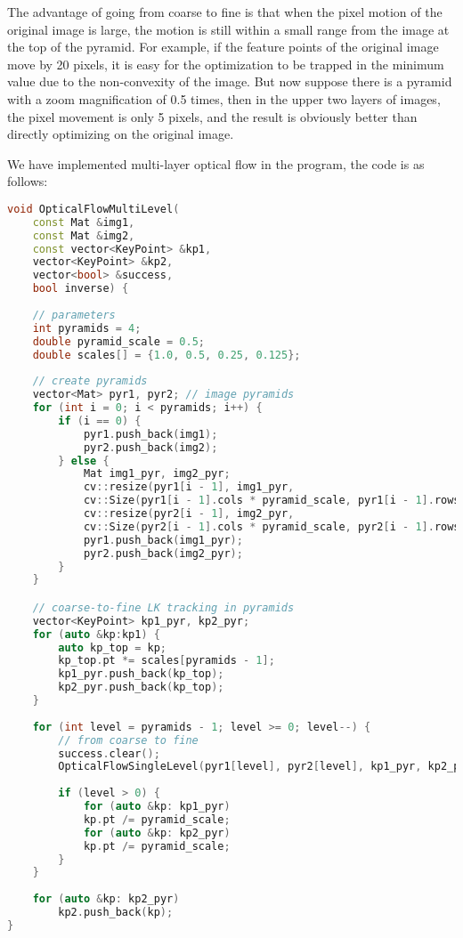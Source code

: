 {The advantage of going from coarse to fine is that when the pixel motion of the original image is large, the motion is still within a small range from the image at the top of the pyramid. For example, if the feature points of the original image move by 20 pixels, it is easy for the optimization to be trapped in the minimum value due to the non-convexity of the image. But now suppose there is a pyramid with a zoom magnification of 0.5 times, then in the upper two layers of images, the pixel movement is only 5 pixels, and the result is obviously better than directly optimizing on the original image.

We have implemented multi-layer optical flow in the program, the code is as follows:
\begin{lstlisting}[language=c++,caption=slambook2/ch8/optical_flow.cpp (snippet)]
void OpticalFlowMultiLevel(
	const Mat &img1,
	const Mat &img2,
	const vector<KeyPoint> &kp1,
	vector<KeyPoint> &kp2,
	vector<bool> &success,
	bool inverse) {
	
	// parameters
	int pyramids = 4;
	double pyramid_scale = 0.5;
	double scales[] = {1.0, 0.5, 0.25, 0.125};
	
	// create pyramids
	vector<Mat> pyr1, pyr2; // image pyramids
	for (int i = 0; i < pyramids; i++) {
		if (i == 0) {
			pyr1.push_back(img1);
			pyr2.push_back(img2);
		} else {
			Mat img1_pyr, img2_pyr;
			cv::resize(pyr1[i - 1], img1_pyr,
			cv::Size(pyr1[i - 1].cols * pyramid_scale, pyr1[i - 1].rows * pyramid_scale));
			cv::resize(pyr2[i - 1], img2_pyr,
			cv::Size(pyr2[i - 1].cols * pyramid_scale, pyr2[i - 1].rows * pyramid_scale));
			pyr1.push_back(img1_pyr);
			pyr2.push_back(img2_pyr);
		}
	}

	// coarse-to-fine LK tracking in pyramids
	vector<KeyPoint> kp1_pyr, kp2_pyr;
	for (auto &kp:kp1) {
		auto kp_top = kp;
		kp_top.pt *= scales[pyramids - 1];
		kp1_pyr.push_back(kp_top);
		kp2_pyr.push_back(kp_top);
	}
	
	for (int level = pyramids - 1; level >= 0; level--) {
		// from coarse to fine
		success.clear();
		OpticalFlowSingleLevel(pyr1[level], pyr2[level], kp1_pyr, kp2_pyr, success, inverse, true);
		
		if (level > 0) {
			for (auto &kp: kp1_pyr)
			kp.pt /= pyramid_scale;
			for (auto &kp: kp2_pyr)
			kp.pt /= pyramid_scale;
		}
	}
	
	for (auto &kp: kp2_pyr)
		kp2.push_back(kp);
}
\end{lstlisting}

}
